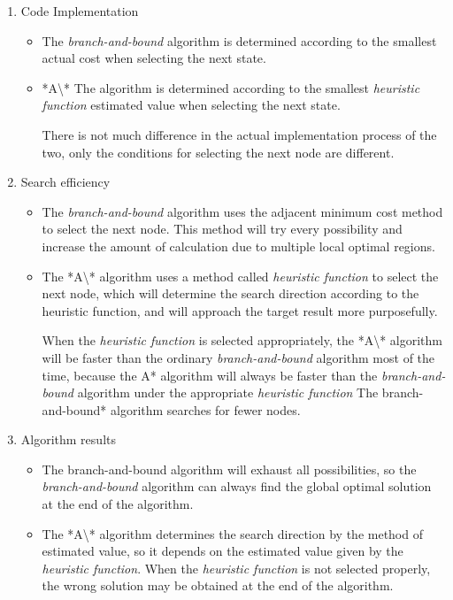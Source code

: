 \documentclass[
]{article}
\begin{document}
\begin{enumerate}
\def\labelenumi{\arabic{enumi}.}
\item
  Code Implementation

  \begin{itemize}
  \item
    The \emph{branch-and-bound} algorithm is determined according to the
    smallest actual cost when selecting the next state.
  \item
    *A\textbackslash** The algorithm is determined according to the
    smallest \emph{heuristic function} estimated value when selecting
    the next state.

    There is not much difference in the actual implementation process of
    the two, only the conditions for selecting the next node are
    different.
  \end{itemize}
\item
  Search efficiency

  \begin{itemize}
  \item
    The \emph{branch-and-bound} algorithm uses the adjacent minimum cost
    method to select the next node. This method will try every
    possibility and increase the amount of calculation due to multiple
    local optimal regions.
  \item
    The *A\textbackslash** algorithm uses a method called
    \emph{heuristic function} to select the next node, which will
    determine the search direction according to the heuristic function,
    and will approach the target result more purposefully.

    When the \emph{heuristic function} is selected appropriately, the
    *A\textbackslash** algorithm will be faster than the ordinary
    \emph{branch-and-bound} algorithm most of the time, because the A*
    algorithm will always be faster than the \emph{branch-and-bound}
    algorithm under the appropriate \emph{heuristic function} The
    branch-and-bound* algorithm searches for fewer nodes.
  \end{itemize}
\item
  Algorithm results

  \begin{itemize}
  \item
    The branch-and-bound algorithm will exhaust all possibilities, so
    the \emph{branch-and-bound} algorithm can always find the global
    optimal solution at the end of the algorithm.
  \item
    The *A\textbackslash** algorithm determines the search direction by
    the method of estimated value, so it depends on the estimated value
    given by the \emph{heuristic function}. When the \emph{heuristic
    function} is not selected properly, the wrong solution may be
    obtained at the end of the algorithm.
  \end{itemize}
\end{enumerate}
\end{document}
